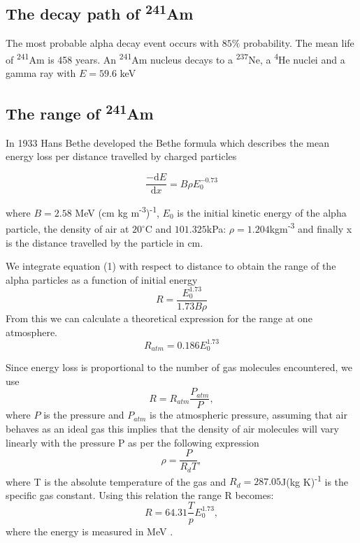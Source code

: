 \documentclass[a4paper]{article}
\begin{document}
\begin{multicols}{2}
\subsection{The decay path of \textsuperscript{241}Am}
The most probable alpha decay event occurs with $85\%$ probability.
The mean life of \textsuperscript{241}Am is 458 years.\cite{SPA}
An \textsuperscript{241}Am nucleus decays to a \textsuperscript{237}Ne, a \textsuperscript{4}He nuclei and a gamma ray with $E = 59.6$ keV\cite{americium}
\subsection{The range of \textsuperscript{241}Am}
In 1933 Hans Bethe developed the Bethe formula which describes the mean energy loss per distance travelled by charged particles\cite{Bethe}

\begin{equation} \frac{-\mathrm{d} E}{\mathrm{d} x} = B \rho E_0^{- 0.73}
\end{equation}

where $B = 2.58$ MeV (cm kg m\textsuperscript{-3})\textsuperscript{-1}, $E_0$ is the initial kinetic energy of the alpha particle, the density of air at $20^{\circ}$C and $101.325$kPa: $\rho = 1.204$kgm\textsuperscript{-3} and finally x is the distance travelled by the particle in cm.

We integrate equation (1) with respect to distance to obtain the range of the alpha particles as a function of initial energy
\begin{equation} R = \frac{E_0^{1.73}}{1.73 B \rho}
\end{equation}
From this we can calculate a theoretical expression for the range at one atmosphere.\cite{SPA}
\begin{equation} R_{atm} = 0.186 E_0^{1.73}
\end{equation}

Since energy loss is proportional to the number of gas molecules encountered\cite{SPA}, we use 
\begin{equation} R = R_{atm} \frac{P_{atm}}{P},
\end{equation}
where $P$ is the pressure and $P_{atm}$ is the atmospheric pressure, assuming that air behaves as an ideal gas this implies that the density of air molecules will vary linearly with the pressure P \cite{SPA} as per the following expression
\begin{equation} \rho = \frac{P}{R_d T},
\end{equation}
where T is the absolute temperature of the gas and $R_d = 287.05$J(kg K)\textsuperscript{-1} is the specific gas constant.
Using this relation the range R becomes:
\begin{equation} R = 64.31 \frac{T}{p} E_0^{1.73},
\end{equation}
where the energy is measured in MeV \cite{SPA}. 


\end{multicols}
\end{document}
